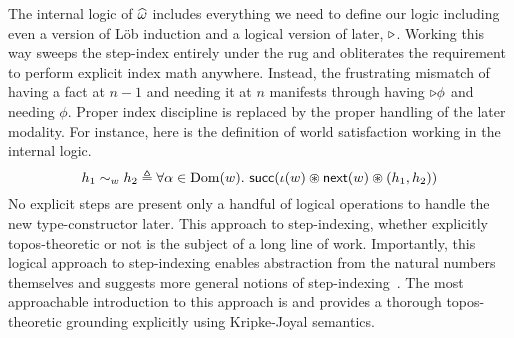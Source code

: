The internal logic of $\widehat{\omega}$ includes everything we
need to define our logic including even a version of L\"ob induction and
a logical version of later, ${\triangleright}$. Working this way sweeps the
step-index entirely under the rug and obliterates the requirement to
perform explicit index math anywhere. Instead, the frustrating
mismatch of having a fact at $n - 1$ and needing it at $n$ manifests
through having ${\triangleright} \phi$ and needing $\phi$. Proper index
discipline is replaced by the proper handling of the later
modality. For instance, here is the definition of world satisfaction
working in the internal logic.
\[
  h_1 \sim_w h_2 \triangleq
  \forall \alpha \in \operatorname{Dom}(w).
  \ \mathsf{succ}(\iota(w) \circledast \mathsf{next}(w) \circledast (h_1, h_2))
\]
No explicit steps are present only a handful of logical operations to
handle the new type-constructor later. This approach to step-indexing,
whether explicitly topos-theoretic or not is the subject of a long
line of work. Importantly, this logical approach to step-indexing
enables abstraction from the natural numbers themselves and suggests
more general notions of step-indexing~\citep{Svendsen:16}. The most
approachable introduction to this approach is \citet{Dreyer:09} and
\citet{Birkedal:steps:11} provides a thorough topos-theoretic
grounding explicitly using Kripke-Joyal semantics.


